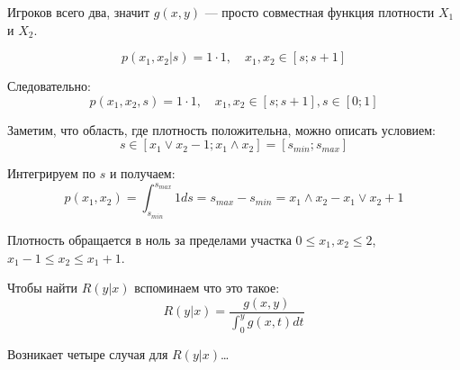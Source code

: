 \begin{enumerate}


Игроков всего два, значит $ g(x,y) $ — просто совместная функция плотности $ X_{1} $ и $ X_{2} $.

\begin{equation}
p(x_{1},x_{2}|s)=1\cdot 1, \quad x_{1},x_{2}\in [s;s+1]
\end{equation}

Следовательно:
\begin{equation}
p(x_{1},x_{2},s)=1\cdot 1, \quad x_{1},x_{2}\in [s;s+1], s\in [0;1]
\end{equation}

Заметим, что область, где плотность положительна, можно описать условием:
\begin{equation}
s\in [x_{1}\vee x_{2}-1; x_{1}\wedge x_{2}]=[s_{min};s_{max}]
\end{equation}

Интегрируем по $ s $ и получаем:
\begin{equation}
p(x_{1},x_{2})=\int_{s_{min}}^{s_{max}} 1 ds= s_{max}-s_{min}=x_{1}\wedge x_{2}-x_{1}\vee x_{2}+1
\end{equation}

Плотность обращается в ноль за пределами участка $ 0\leq x_{1},x_{2}\leq 2 $, $ x_{1}-1\leq x_{2} \leq x_{1}+1 $.

Чтобы найти $ R(y|x) $ вспоминаем что это такое:
\begin{equation}
R(y|x)=\frac{g(x,y)}{\int_{0}^{y}g(x,t)dt}
\end{equation}

Возникает четыре случая для $ R(y|x) $\ldots  



\end{enumerate}
